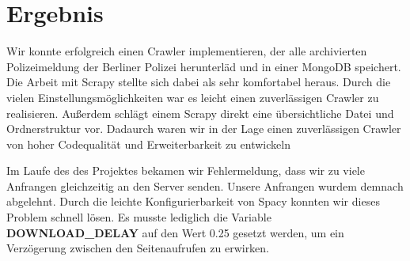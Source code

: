 \section{Ergebnis}

Wir konnte erfolgreich einen Crawler implementieren, der alle archivierten Polizeimeldung der Berliner Polizei herunterläd
und in einer MongoDB speichert. Die Arbeit mit Scrapy stellte sich dabei als sehr komfortabel heraus.
Durch die vielen Einstellungsmöglichkeiten war es leicht einen zuverlässigen Crawler zu realisieren.
Außerdem schlägt einem Scrapy direkt eine übersichtliche Datei und Ordnerstruktur vor. Dadaurch waren wir in der Lage einen zuverlässigen Crawler
von hoher Codequalität und Erweiterbarkeit zu entwickeln

Im Laufe des des Projektes bekamen wir Fehlermeldung, dass wir zu viele Anfrangen gleichzeitig an den Server senden.
Unsere Anfrangen wurdem demnach abgelehnt. Durch die leichte Konfigurierbarkeit von Spacy konnten wir dieses Problem schnell lösen.
Es musste lediglich die Variable \textbf{DOWNLOAD\_DELAY}  auf den Wert 0.25 gesetzt werden, um ein Verzögerung zwischen den Seitenaufrufen zu
erwirken.




